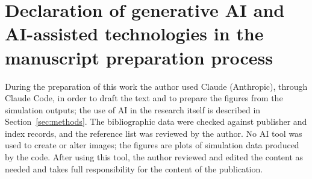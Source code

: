 \section*{Declaration of generative AI and AI-assisted technologies in the manuscript preparation process}
During the preparation of this work the author used Claude (Anthropic), through Claude Code, in order to draft the
text and to prepare the figures from the simulation outputs; the use of AI in the research itself is described in
Section~\ref{sec:methods}. The bibliographic data were checked against publisher and index records, and the
reference list was reviewed by the author. No AI tool was used to create or alter images; the figures are plots of
simulation data produced by the code. After using this tool, the author reviewed and edited the content as needed
and takes full responsibility for the content of the publication.
